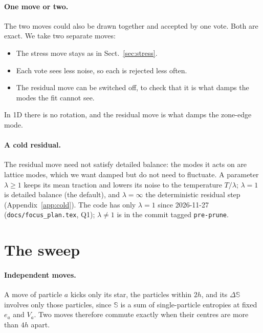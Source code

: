 \documentclass[11pt,aps,preprint,nofootinbib,superscriptaddress,tightenlines]{revtex4-2}
\def\Sect#1{Sect.~\ref{#1}}
\def\App#1{Appendix~\ref{#1}}
\let\oldparagraph\paragraph
\renewcommand{\paragraph}{\par\bigskip\oldparagraph}
\begin{document}
\paragraph{One move or two.}  The two moves could also be drawn together and
accepted by one vote.  Both are exact.  We take two separate moves:
\begin{itemize}
\item The stress move stays as in \Sect{sec:stress}.
\item Each vote sees less noise, so each is rejected less often.
\item The residual move can be switched off, to check that it is what damps the
  modes the fit cannot see.
\end{itemize}
In 1D there is no rotation, and the residual move is what damps the zone-edge
mode.

\paragraph{A cold residual.}  The residual move need not satisfy detailed balance: the modes it acts on
are lattice modes, which we want damped but do not need to fluctuate.  A parameter $\lambda\geq1$
keeps its mean traction and lowers its noise to the temperature $T/\lambda$; $\lambda=1$ is detailed
balance (the default), and $\lambda=\infty$ the deterministic residual step (\App{app:cold}).  The code has only $\lambda=1$ since
2026-11-27 (\nolinkurl{docs/focus_plan.tex}, Q1); $\lambda\neq1$ is in the commit tagged \texttt{pre-prune}.

\section{The sweep}
\label{sec:sweep}

\paragraph{Independent moves.}  A move of particle $a$ kicks only its star,
the particles within $2h$, and its $\Delta\mathbb S$ involves only those
particles, since $\mathbb S$ is a sum of single-particle entropies at fixed $e_a$
and $V_a$.  Two moves therefore commute exactly when their centres are more than
$4h$ apart.
\end{document}
